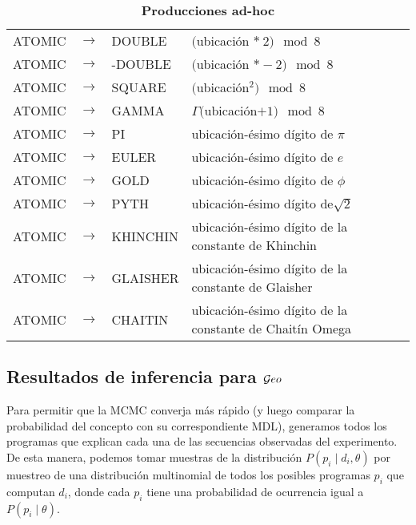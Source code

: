 \begin{table}[!ht]
\centering
\caption{{\bf Producciones ad-hoc}}
\label{table:adhoc}
\begin{tabular}{lll|l}
\thickhline
ATOMIC  & $\rightarrow$ & DOUBLE & $($ubicación $*\ 2) \mod 8$  \\
ATOMIC  & $\rightarrow$ & -DOUBLE & $($ubicación $* -2) \mod 8$ \\
ATOMIC  & $\rightarrow$ & SQUARE & $($ubicación$^2) \mod 8$ \\
ATOMIC  & $\rightarrow$ & GAMMA & $\Gamma($ubicación$+1) \mod 8$ \\
ATOMIC  & $\rightarrow$ & PI & ubicación-ésimo dígito de $\pi$ \\
ATOMIC  & $\rightarrow$ & EULER & ubicación-ésimo dígito de $e$ \\
ATOMIC  & $\rightarrow$ & GOLD & ubicación-ésimo dígito de $\phi$ \\
ATOMIC  & $\rightarrow$ & PYTH & ubicación-ésimo dígito de$\sqrt{2}$ \\
ATOMIC  & $\rightarrow$ & KHINCHIN & ubicación-ésimo dígito de la constante de Khinchin\\
ATOMIC  & $\rightarrow$ & GLAISHER & ubicación-ésimo dígito de la constante de Glaisher\\
ATOMIC  & $\rightarrow$ & CHAITIN & ubicación-ésimo dígito de la constante de Chaitín Omega\\
\hline
\end{tabular}
\end{table}

\subsection{Resultados de inferencia para $\mathcal Geo$}


Para permitir que la MCMC converja más rápido (y luego comparar la probabilidad del concepto con su correspondiente MDL), generamos todos los programas que explican cada una de las secuencias observadas del experimento. De esta manera, podemos tomar muestras de la distribución $P(p_i \mid d_i, \theta)$ por muestreo de una distribución multinomial de todos los posibles programas $p_i$ que computan $d_i$, donde cada $p_i$ tiene una probabilidad de ocurrencia igual a $P(p_i \mid \theta)$.


